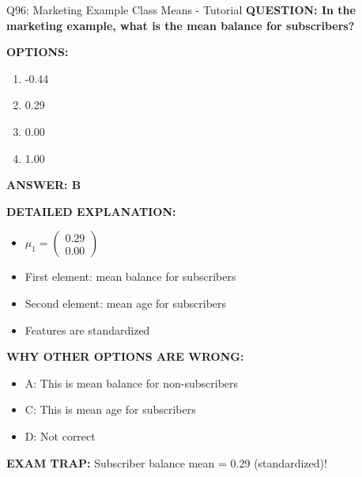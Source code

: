 \documentclass[8pt]{beamer}
\begin{document}
	\begin{frame}{Q96: Marketing Example Class Means - Tutorial}
		\fontsize{6.5}{7.5}\selectfont
		\textbf{QUESTION: In the marketing example, what is the mean balance for subscribers?}
		
		\vspace{0.1cm}
		\textbf{OPTIONS:}
		\begin{enumerate}
			\item -0.44
			\item 0.29
			\item 0.00
			\item 1.00
		\end{enumerate}
		
		\vspace{0.1cm}
		\textcolor{myblue}{\textbf{ANSWER: B}}
		
		\vspace{0.1cm}
		\textbf{DETAILED EXPLANATION:}
		\begin{itemize}
			\item $\mu_1 = \begin{pmatrix} 0.29 \\ 0.00 \end{pmatrix}$
			\item First element: mean balance for subscribers
			\item Second element: mean age for subscribers
			\item Features are standardized
		\end{itemize}
		
		\vspace{0.1cm}
		\textcolor{myred}{\textbf{WHY OTHER OPTIONS ARE WRONG:}}
		\begin{itemize}
			\item \textcolor{myred}{A:} This is mean balance for non-subscribers
			\item \textcolor{myred}{C:} This is mean age for subscribers
			\item \textcolor{myred}{D:} Not correct
		\end{itemize}
		
		\textcolor{myred}{\textbf{EXAM TRAP:}} Subscriber balance mean = \textcolor{myblue}{0.29} (standardized)!
	\end{frame}
	
\end{document}
